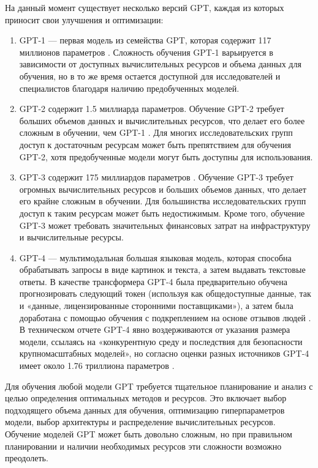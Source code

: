 \documentclass[a4paper,12pt]{extarticle}
\begin{document}
На данный момент существует несколько версий GPT, каждая из которых приносит свои улучшения и оптимизации:
\begin{enumerate}[label=\arabic*.]
	\item GPT-1 — первая модель из семейства GPT, которая содержит 117 миллионов параметров \cite{gpt-1}. Сложность обучения GPT-1 варьируется в зависимости от доступных вычислительных ресурсов и объема данных для обучения, но в то же время остается доступной для исследователей и специалистов благодаря наличию предобученных моделей. 
	\item GPT-2 содержит 1.5 миллиарда параметров. Обучение GPT-2 требует больших объемов данных и вычислительных ресурсов, что делает его более сложным в обучении, чем GPT-1 \cite{gpt-2}. Для многих исследовательских групп доступ к достаточным ресурсам может быть препятствием для обучения GPT-2, хотя предобученные модели могут быть доступны для использования.
	\item GPT-3 содержит 175 миллиардов параметров \cite{gpt-3}. Обучение GPT-3 требует огромных вычислительных ресурсов и больших объемов данных, что делает его крайне сложным в обучении. Для большинства исследовательских групп доступ к таким ресурсам может быть недостижимым. Кроме того, обучение GPT-3 может требовать значительных финансовых затрат на инфраструктуру и вычислительные ресурсы.
	\item GPT-4 — мультимодальная большая языковая модель, которая способна обрабатывать запросы в виде картинок и текста, а затем выдавать текстовые ответы. В качестве трансформера GPT-4 была предварительно обучена прогнозировать следующий токен (используя как общедоступные данные, так и «данные, лицензированные сторонними поставщиками»), а затем была доработана с помощью обучения с подкреплением на основе отзывов людей \cite{gpt-4}. В техническом отчете GPT-4 явно воздерживаются от указания размера модели, ссылаясь на «конкурентную среду и последствия для безопасности крупномасштабных моделей», но согласно оценки разных источников GPT-4 имеет около 1.76 триллиона параметров \cite{gpt-4-params}.
\end{enumerate}

Для обучения любой модели GPT требуется тщательное планирование и анализ с целью определения оптимальных методов и ресурсов. Это включает выбор подходящего объема данных для обучения, оптимизацию гиперпараметров модели, выбор архитектуры и распределение вычислительных ресурсов. Обучение моделей GPT может быть довольно сложным, но при правильном планировании и наличии необходимых ресурсов эти сложности возможно преодолеть.
\end{document}
